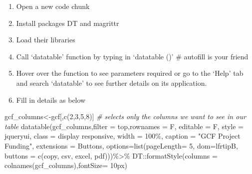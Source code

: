 \documentclass[
]{book}
\newenvironment{Shaded}{\begin{snugshade}}{\end{snugshade}}
\newcommand{\AttributeTok}[1]{\textcolor[rgb]{0.77,0.63,0.00}{#1}}
\newcommand{\CommentTok}[1]{\textcolor[rgb]{0.56,0.35,0.01}{\textit{#1}}}
\newcommand{\DecValTok}[1]{\textcolor[rgb]{0.00,0.00,0.81}{#1}}
\newcommand{\FunctionTok}[1]{\textcolor[rgb]{0.00,0.00,0.00}{#1}}
\newcommand{\NormalTok}[1]{#1}
\newcommand{\OtherTok}[1]{\textcolor[rgb]{0.56,0.35,0.01}{#1}}
\newcommand{\SpecialCharTok}[1]{\textcolor[rgb]{0.00,0.00,0.00}{#1}}
\newcommand{\StringTok}[1]{\textcolor[rgb]{0.31,0.60,0.02}{#1}}
\providecommand{\tightlist}{%
  \setlength{\itemsep}{0pt}\setlength{\parskip}{0pt}}
\begin{document}
\begin{enumerate}
\def\labelenumi{\arabic{enumi}.}
\tightlist
\item
  Open a new code chunk
\item
  Install packages DT and magrittr
\item
  Load their libraries\\
\item
  Call `datatable' function by typing in `datatable ()' \# autofill is your friend
\item
  Hover over the function to see parameters required or go to the `Help' tab and search `datatable' to see further details on its application.
\item
  Fill in details as below
\end{enumerate}

\begin{Shaded}
\begin{Highlighting}[]
\NormalTok{gcf\_columns}\OtherTok{\textless{}{-}}\NormalTok{gcf[,}\FunctionTok{c}\NormalTok{(}\DecValTok{2}\NormalTok{,}\DecValTok{3}\NormalTok{,}\DecValTok{5}\NormalTok{,}\DecValTok{8}\NormalTok{)] }\CommentTok{\# selects only the columns we want to see in our table}
\FunctionTok{datatable}\NormalTok{(gcf\_columns,}\AttributeTok{filter =} \StringTok{\textquotesingle{}top\textquotesingle{}}\NormalTok{,}\AttributeTok{rownames =}\NormalTok{ F, }\AttributeTok{editable =}\NormalTok{ F, }\AttributeTok{style =} \StringTok{\textquotesingle{}jqueryui\textquotesingle{}}\NormalTok{, }\AttributeTok{class =} \StringTok{\textquotesingle{}display responsive\textquotesingle{}}\NormalTok{, }\AttributeTok{width =} \StringTok{\textquotesingle{}100\%\textquotesingle{}}\NormalTok{, }\AttributeTok{caption =} \StringTok{"GCF Project Funding"}\NormalTok{, }\AttributeTok{extensions =} \StringTok{\textquotesingle{}Buttons\textquotesingle{}}\NormalTok{, }\AttributeTok{options=}\FunctionTok{list}\NormalTok{(}\AttributeTok{pageLength=} \DecValTok{5}\NormalTok{, }\AttributeTok{dom=}\StringTok{\textquotesingle{}lfrtipB\textquotesingle{}}\NormalTok{, }\AttributeTok{buttons =} \FunctionTok{c}\NormalTok{(}\StringTok{\textquotesingle{}copy\textquotesingle{}}\NormalTok{, }\StringTok{\textquotesingle{}csv\textquotesingle{}}\NormalTok{, }\StringTok{\textquotesingle{}excel\textquotesingle{}}\NormalTok{, }\StringTok{\textquotesingle{}pdf\textquotesingle{}}\NormalTok{)))}\SpecialCharTok{\%\textgreater{}\%}
\NormalTok{  DT}\SpecialCharTok{::}\FunctionTok{formatStyle}\NormalTok{(}\AttributeTok{columns =} \FunctionTok{colnames}\NormalTok{(gcf\_columns),}\AttributeTok{fontSize=} \StringTok{\textquotesingle{}10px\textquotesingle{}}\NormalTok{)}
\end{Highlighting}
\end{Shaded}
\end{document}

